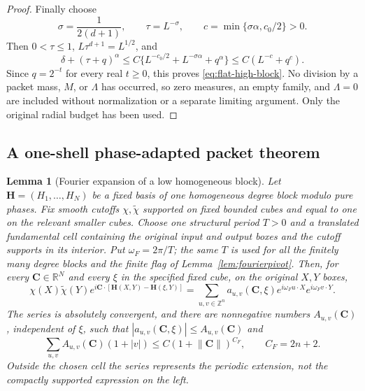 \documentclass[11pt]{article}
\numberwithin{equation}{section}
\newtheorem{lemma}[theorem]{Lemma}
\theoremstyle{remark}
\theoremstyle{definition}
\newcommand{\R}{\mathbb R}
\newcommand{\norm}[1]{\lVert #1\rVert}
\begin{document}
\begin{proof}
Finally choose
\[
 \sigma=\frac1{2(d+1)},\qquad \tau=L^{-\sigma},\qquad
 c=\min\{\sigma\alpha,c_0/2\}>0.
\]
Then $0<\tau\le1$, $L\tau^{d+1}=L^{1/2}$, and
\[
 \delta+(\tau+q)^\alpha
 \le C\{L^{-c_0/2}+L^{-\sigma\alpha}+q^\alpha\}
 \le C(L^{-c}+q^c).
\]
Since $q=2^{-t}$ for every real $t\ge0$, this proves
\eqref{eq:flat-high-block}.  No division by a packet mass, $M$, or
$\Lambda$ has occurred, so zero measures, an empty family, and
$\Lambda=0$ are included without normalization or a separate limiting
argument.  Only the original radial budget has been used.
\end{proof}

\subsection{A one-shell phase-adapted packet theorem}

\begin{lemma}[Fourier expansion of a low homogeneous block]
\label{lem:block-fourier}
Let $\mathbf H=(H_1,\ldots,H_N)$ be a fixed basis of one homogeneous
degree block modulo pure phases.  Fix smooth cutoffs
$\chi,\widetilde\chi$ supported on fixed bounded cubes and equal to one
on the relevant smaller cubes.  Choose one structural period $T>0$ and
a translated fundamental cell containing the original input and output
boxes and the cutoff supports in its interior.  Put $\omega_F=2\pi/T$;
the same $T$ is used for all the finitely many degree blocks and the
finite flag of Lemma~\ref{lem:fourierpivot}.
Then, for every $\mathbf C\in\R^N$ and every $\xi$ in the specified
fixed cube, on the original $X,Y$ boxes,
\[
 \chi(X)\widetilde\chi(Y)
 e^{i\mathbf C\cdot[\mathbf H(X,Y)-\mathbf H(\xi,Y)]}
 =\sum_{u,v\in\mathbb Z^n}a_{u,v}(\mathbf C,\xi)
   e^{i\omega_F u\cdot X}e^{i\omega_F v\cdot Y}.
\]
The series is absolutely convergent, and there are nonnegative numbers
$A_{u,v}(\mathbf C)$, independent of $\xi$, such
that $|a_{u,v}(\mathbf C,\xi)|\le A_{u,v}(\mathbf C)$ and
\begin{equation}\label{eq:block-fourier}
 \sum_{u,v}A_{u,v}(\mathbf C)(1+|v|)
 \le C(1+\norm{\mathbf C})^{C_F},\qquad C_F=2n+2.
\end{equation}
Outside the chosen cell the series represents the periodic extension,
not the compactly supported expression on the left.
\end{lemma}
\end{document}

